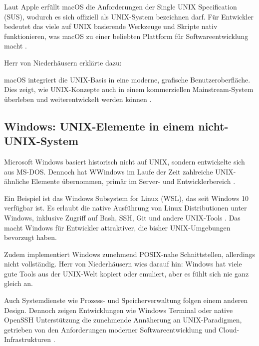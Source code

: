 Laut Apple erfüllt macOS die Anforderungen der Single UNIX Specification (SUS), wodurch es sich offiziell als UNIX-System bezeichnen darf. Für Entwickler bedeutet
das viele auf UNIX basierende Werkzeuge und Skripte nativ funktionieren, was macOS zu einer beliebten Plattform für Softwareentwicklung macht \cite{OSConcept}.

Herr von Niederhäusern erklärte dazu: %

macOS integriert die UNIX-Basis in eine moderne, grafische Benutzeroberfläche. Dies zeigt, wie UNIX-Konzepte auch in einem kommerziellen Mainstream-System überleben
und weiterentwickelt werden können \cite{FreeBSDOS}.


\newpage
\subsection{Windows: UNIX-Elemente in einem nicht-UNIX-System}

Microsoft Windows basiert historisch nicht auf UNIX, sondern entwickelte sich aus MS-DOS. Dennoch hat WWindows im Laufe der Zeit zahlreiche UNIX-ähnliche Elemente
übernommen, primär im Server- und Entwicklerbereich \cite{ModernOS}.

Ein Beispiel ist das Windows Subsystem for Linux (WSL), das seit Windows 10 verfügbar ist. Es erlaubt die native Ausführung von Linux Distributionen unter Windows,
inklusive Zugriff auf Bash, SSH, Git und andere UNIX-Tools \cite{WSL}. Das macht Windows für Entwickler attraktiver, die bisher UNIX-Umgebungen bevorzugt haben.

Zudem implementiert Windows zunehmend POSIX-nahe Schnittstellen, allerdings nicht vollständig. Herr von Niederhäusern wies darauf hin: \glqq Windows hat viele gute
Tools aus der UNIX-Welt kopiert oder emuliert, aber es fühlt sich nie ganz gleich an\grqq \cite{interviewNH}.

Auch Systemdienste wie Prozess- und Speicherverwaltung folgen einem anderen Design. Dennoch zeigen Entwicklungen wie Windows Terminal oder native OpenSSH
Unterstützung die zunehmende Annäherung an UNIX-Paradigmen, getrieben von den Anforderungen moderner Softwareentwicklung und Cloud-Infrastrukturen
\cite{ArtOfUnixProgramming, OSConcept}.